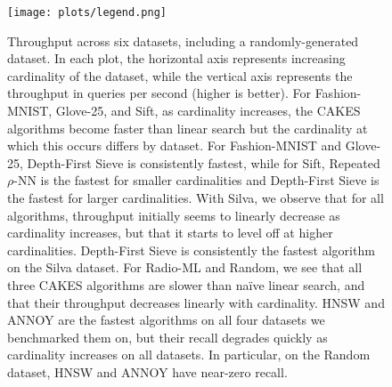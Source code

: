 \begin{figure}[t]
    \centering
  
  
  
    \vspace{2pt}
    \texttt{[image: plots/legend.png]}
  
    \caption{Throughput across six datasets, including a randomly-generated dataset.
        In each plot, the horizontal axis represents increasing cardinality of the dataset, while the vertical axis represents the throughput in queries per second (higher is better).
        For Fashion-MNIST, Glove-25, and Sift, as cardinality increases, the CAKES algorithms become faster than linear search but the cardinality at which this occurs differs by dataset.
        For Fashion-MNIST and Glove-25, Depth-First Sieve is consistently fastest, while for Sift, Repeated $\rho$-NN is the fastest for smaller cardinalities and Depth-First Sieve is the fastest for larger cardinalities.
        With Silva, we observe that for all algorithms, throughput initially seems to linearly decrease as cardinality increases, but that it starts to level off at higher cardinalities.
        Depth-First Sieve is consistently the fastest algorithm on the Silva dataset.
        For Radio-ML and Random, we see that all three CAKES algorithms are slower than na\"{i}ve linear search, and that their throughput decreases linearly with cardinality.
        HNSW and ANNOY are the fastest algorithms on all four datasets we benchmarked them on, but their recall degrades quickly as cardinality increases on all datasets.
        In particular, on the Random dataset, HNSW and ANNOY have near-zero recall.}
    \label{fig:results:scaling-plots}
  \end{figure}


